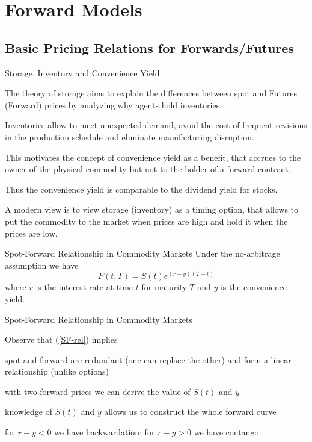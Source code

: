 \section{Forward Models}
\subsection{Basic Pricing Relations for Forwards/Futures}

{Storage, Inventory and Convenience Yield}
\item<1-> The theory of storage aims to explain the differences between spot
and Futures (Forward) prices by analyzing why agents hold inventories.
\item<2-> Inventories
allow to meet unexpected demand, avoid the cost of frequent revisions in
the production schedule and eliminate manufacturing disruption.
\item<3-> This
motivates the concept of convenience yield as a benefit, that accrues to the
owner of the physical commodity but not to the holder of a forward contract.
\item<4-> Thus the convenience yield is comparable to the dividend yield for stocks.
\item<5-> A modern view is to view storage (inventory) as a timing option, that
allows to put the commodity to the market when prices are high
and hold it when the prices are low.

{Spot-Forward Relationship in Commodity Markets }
Under the no-arbitrage assumption we have
\begin{equation}\label{SF-rel}
F(t,T)=S(t)e^{(r-y)(T-t)}
\end{equation}
where $r$ is the interest rate at time $t$ for maturity $T$ and $y$ is the convenience yield.

{Spot-Forward Relationship in Commodity Markets }

Observe that (\ref{SF-rel}) implies
\item<1-> spot and forward are redundant (one can replace the other) and form a
linear relationship (unlike options)
\item<2-> with two forward prices we can derive the value of $S(t)$ and $y$
\item<3-> knowledge of $S(t)$ and $y$ allows us to construct the whole forward curve
\item<4-> for $r-y <0$ we have backwardation; for $r-y>0$ we have contango.

